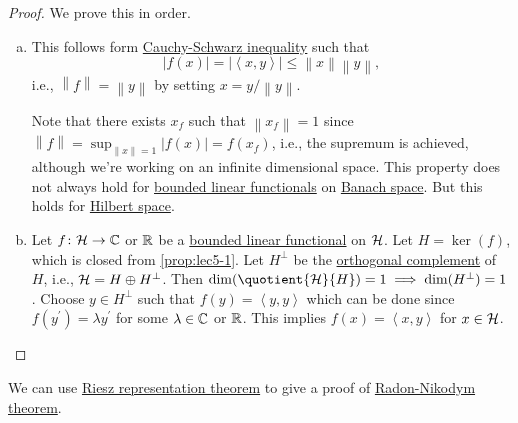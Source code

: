\begin{proof}
	We prove this in order.
	\begin{enumerate}[(a)]
		\item This follows form \hyperref[thm:Cauchy-Schwarz-ineq]{Cauchy-Schwarz inequality} such that
		      \[
			      \left\vert f(x) \right\vert = \left\vert \left\langle x, y \right\rangle  \right\vert \leq \left\lVert x\right\rVert \left\lVert y\right\rVert ,
		      \]
		      i.e., \(\left\lVert f\right\rVert = \left\lVert y\right\rVert \) by setting \(x = y / \left\lVert y\right\rVert \).
		      \begin{note}
			      Note that there exists \(x_f\) such that \(\left\lVert x_f\right\rVert = 1\) since \(\left\lVert f\right\rVert = \sup _{\left\lVert x\right\rVert = 1} \left\vert f(x) \right\vert = f(x_f)\), i.e., the supremum is achieved, although we're working on an infinite dimensional space. This property does not always hold for \hyperref[def:bounded-linear-functional]{bounded linear functionals} on \hyperref[def:Banach-space]{Banach space}. But this holds for \hyperref[def:Hilbert-space]{Hilbert space}.
		      \end{note}
		\item Let \(f\colon \mathcal{\MakeUppercase{h}} \to \mathbb{\MakeUppercase{c}} \) or \(\mathbb{\MakeUppercase{r}} \) be a \hyperref[def:bounded-linear-functional]{bounded linear functional} on \(\mathcal{\MakeUppercase{h}} \). Let \(H = \ker(f)\), which is closed from \autoref{prop:lec5-1}. Let \(H ^\perp\) be the \hyperref[def:orthogonal-complement]{orthogonal complement} of \(H\), i.e., \(\mathcal{\MakeUppercase{h}} = H\oplus H^\perp\). Then \(\dim (\quotient{\mathcal{\MakeUppercase{h}} }{H} )= 1\implies \dim(H^\perp) = 1\). Choose \(y\in H^\perp\) such that \(f(y) = \left\langle y, y \right\rangle \) which can be done since \(f(y^\prime ) = \lambda y^\prime \) for some \(\lambda \in \mathbb{\MakeUppercase{c}} \) or \(\mathbb{\MakeUppercase{r}} \). This implies \(f(x) = \left\langle x, y \right\rangle \) for \(x\in \mathcal{\MakeUppercase{h}} \).
	\end{enumerate}
\end{proof}

We can use \hyperref[thm:Riesz-representation]{Riesz representation theorem} to give a proof of \href{https://en.wikipedia.org/wiki/Radon%E2%80%93Nikodym_theorem}{Radon-Nikodym theorem}. 


